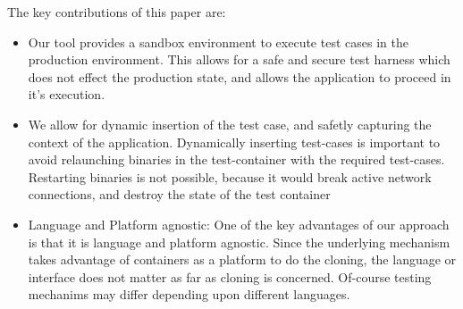 The key contributions of this paper are:

\begin{itemize}
\item Our tool provides a sandbox environment to execute test cases in the production environment. 
This allows for a safe and secure test harness which does not effect the production state, and allows the application to proceed in it's execution.
\item We allow for dynamic insertion of the test case, and safetly capturing the context of the application. Dynamically inserting test-cases is important to avoid relaunching binaries in the test-container with the required test-cases. 
Restarting binaries is not possible, because it would break active network connections, and destroy the state of the test container
\item Language and Platform agnostic: One of the key advantages of our approach is that it is language and platform agnostic. Since the underlying mechanism takes advantage of containers as a platform to do the cloning, the language or interface does not matter as far as cloning is concerned. 
Of-course testing mechanims may differ depending upon different languages.
\end{itemize}





